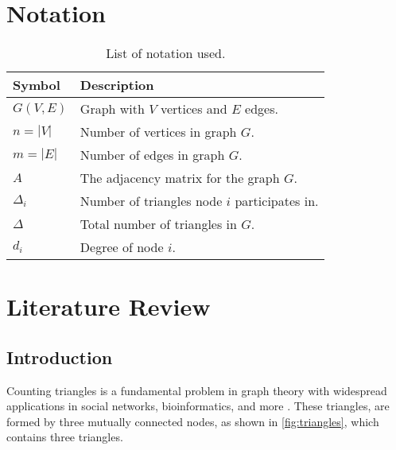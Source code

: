 \documentclass[12pt]{article}
\begin{document}
\tableofcontents

\newpage

\section{Notation}

\begin{table}[ht]
    \centering
    \begin{tabular}{ll}
        \toprule
        \textbf{Symbol} & \textbf{Description} \\
        \midrule
        $G(V, E)$       & Graph with $V$ vertices and $E$ edges. \\
        $n = |V|$       & Number of vertices in graph $G$. \\
        $m = |E|$       & Number of edges in graph $G$. \\
        $A$             & The adjacency matrix for the graph $G$. \\
        $\Delta_i$      & Number of triangles node $i$ participates in. \\ %
        $\Delta$        & Total number of triangles in $G$. \\
        $d_i$           & Degree of node $i$. \\ %
        \bottomrule
    \end{tabular}
    \caption{List of notation used.}
    \label{tab:notation}
\end{table}

\newpage

\section{Literature Review}

\subsection{Introduction}

Counting triangles is a fundamental problem in graph theory with widespread applications in social networks, bioinformatics, and more \cite{lovasz_large_2012}.
These triangles, are formed by three mutually connected nodes, as shown in \ref{fig:triangles}, which contains three triangles.
\end{document}
